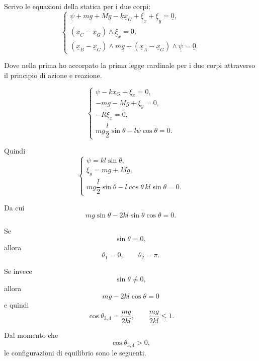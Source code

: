 \begin{example}{}
Scrivo le equazioni della statica per i due corpi:
\[
\left\{
\begin{array}{l}
\underline{\psi}
+
m\underline{g}
+
M\underline{g}
-
k\underline{x}_G
+
\underline{\xi}_x
+
\underline{\xi}_y
=
\underline{0},
\\[2mm]
\left(\underline{x}_C-\underline{x}_G\right)\wedge \underline{\xi}_x
=
\underline{0},
\\[2mm]
\left(\underline{x}_B-\underline{x}_G\right)\wedge m\underline{g}
+
\left(\underline{x}_A-\underline{x}_G\right)\wedge \underline{\psi}
=
\underline{0}.
\end{array}
\right.
\]

Dove nella prima ho accorpato la prima legge cardinale per i due corpi
attraverso il principio di azione e reazione.

\[
\left\{
\begin{array}{l}
\psi-kx_G+\xi_x=0,
\\[1mm]
-mg-Mg+\xi_y=0,
\\[1mm]
-R\xi_x=0,
\\[1mm]
mg\dfrac{l}{2}\sin\theta-l\psi\cos\theta=0.
\end{array}
\right.
\]

Quindi
\[
\left\{
\begin{array}{l}
\psi=kl\sin\theta,
\\[1mm]
\xi_y=mg+Mg,
\\[1mm]
mg\dfrac{l}{2}\sin\theta
-
l\cos\theta\,kl\sin\theta
=0.
\end{array}
\right.
\]

Da cui
\[
mg\sin\theta-2kl\sin\theta\cos\theta=0.
\]

Se
\[
\sin\theta=0,
\]
allora
\[
\theta_1=0,
\qquad
\theta_2=\pi.
\]

Se invece
\[
\sin\theta\neq 0,
\]
allora
\[
mg-2kl\cos\theta=0
\]
e quindi
\[
\cos\theta_{3,4}
=
\frac{mg}{2kl},
\qquad
\frac{mg}{2kl}\leq 1.
\]

Dal momento che
\[
\cos\theta_{3,4}>0,
\]
le configurazioni di equilibrio sono le seguenti.
\begin{center}
\end{center}
\end{example}
